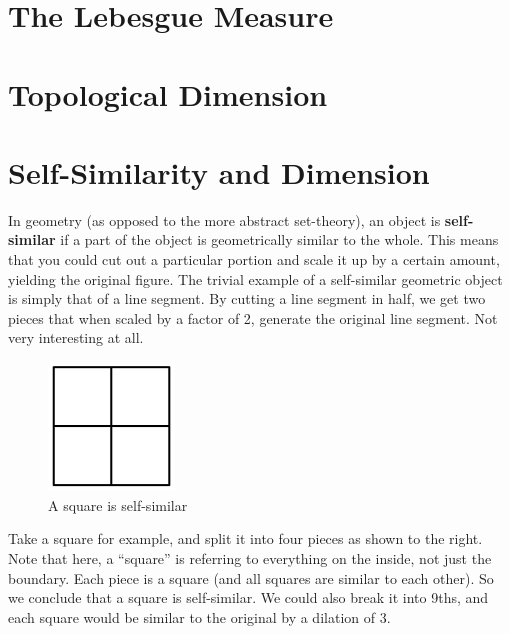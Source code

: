 \section{The Lebesgue Measure}
\Blindtext

\section{Topological Dimension}
\Blindtext

\clearpage

\section{Self-Similarity and Dimension}

In geometry (as opposed to the more abstract set-theory), an object is \textbf{self-similar} if a part of the object is geometrically similar to the whole. This means that you could cut out a particular portion and scale it up by a certain amount, yielding the original figure. The trivial example of a self-similar geometric object is simply that of a line segment. By cutting a line segment in half, we get two pieces that when scaled by a factor of 2, generate the original line segment. Not very interesting at all.\\

\begin{figure}
  \begin{center}
    \includegraphics[width=0.3\textwidth]{Images/1.4.1.jpg}
  \end{center}
  \caption{A square is self-similar}
\end{figure}

Take a square for example, and split it into four pieces as shown to the right. Note that here, a ``square'' is referring to everything on the inside, not just the boundary. Each piece is a square (and all squares are similar to each other).  So we conclude that a square is self-similar. We could also break it into 9ths, and each square would be similar to the original by a dilation of 3.\\

